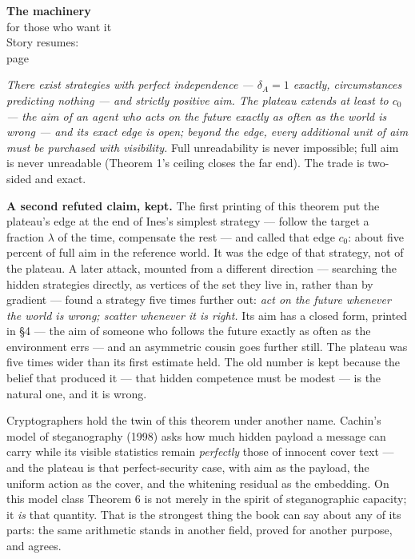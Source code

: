 \begin{machinery}{\textbf{The machinery}\\for those who want it\\[3pt]{\color{muted}Story resumes:\\page~\pageref{ch7}}}



\label{claim-6}

\noindent \emph{There exist
strategies with perfect independence --- \(\delta_A = 1\) exactly, circumstances
predicting nothing --- and strictly positive aim. The plateau extends at
least to \(c_0\) --- the aim of an agent who acts on the future exactly as
often as the world is wrong --- and its exact edge is open; beyond the
edge, every additional unit of aim must be purchased with visibility.}
Full unreadability is never impossible; full aim is never unreadable
(Theorem 1's ceiling closes the far end). The trade is two-sided and
exact.

\textbf{A second refuted claim, kept.}  The first printing
of this theorem put the plateau's edge at the end of Ines's simplest
strategy --- follow the target a fraction \(\lambda\) of the time, compensate the
rest --- and called that edge \(c_0\): about five percent of full aim in the
reference world. It was the edge of that strategy, not of the plateau.
A later attack, mounted from a different direction --- searching the
hidden strategies directly, as vertices of the set they live in, rather
than by gradient --- found a strategy five times further out: \emph{act on the
future whenever the world is wrong; scatter whenever it is right.} Its
aim has a closed form, printed in §4 --- the aim of someone who follows
the future exactly as often as the environment errs --- and an asymmetric
cousin goes further still. The plateau was five times wider than its
first estimate held. The old number is kept because the belief that
produced it --- that hidden competence must be modest --- is the natural
one, and it is wrong.

Cryptographers hold the twin of this theorem under another name. Cachin's model of steganography (1998) asks how much hidden payload a message can carry while its visible statistics remain \emph{perfectly} those of innocent cover text --- and the plateau is that perfect-security case, with aim as the payload, the uniform action as the cover, and the whitening residual as the embedding. On this model class Theorem 6 is not merely in the spirit of steganographic capacity; it \emph{is} that quantity. That is the strongest thing the book can say about any of its parts: the same arithmetic stands in another field, proved for another purpose, and agrees.


\end{machinery}
